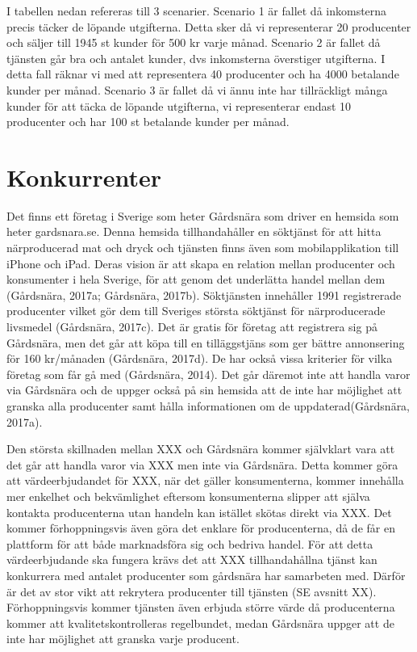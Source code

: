 \documentclass[10pt,a4paper,oneside]{article}
\begin{document}
I tabellen nedan refereras till 3 scenarier. Scenario 1 är fallet då inkomsterna precis täcker de löpande utgifterna. Detta sker då vi representerar 20 producenter och säljer till 1945 st kunder för 500 kr varje månad. Scenario 2 är fallet då tjänsten går bra och antalet kunder, dvs inkomsterna överstiger utgifterna. I detta fall räknar vi med att representera 40 producenter och ha 4000 betalande kunder per månad. Scenario 3 är fallet då vi ännu inte har tillräckligt många kunder för att täcka de löpande utgifterna, vi representerar endast 10 producenter och har 100 st betalande kunder per månad. 

\newpage

\section{Konkurrenter}
Det finns ett företag i Sverige som heter Gårdsnära som driver en hemsida som heter gardsnara.se. Denna hemsida tillhandahåller en söktjänst för att hitta närproducerad mat och dryck och tjänsten finns även som mobilapplikation till iPhone och iPad. Deras vision är att skapa en relation mellan producenter och konsumenter i hela Sverige, för att genom det underlätta handel mellan dem (Gårdsnära, 2017a; Gårdsnära, 2017b). Söktjänsten innehåller 1991 registrerade producenter vilket gör dem till Sveriges största söktjänst för närproducerade livsmedel (Gårdsnära, 2017c). Det är gratis för företag att registrera sig på Gårdsnära, men det går att köpa till en tilläggstjäns som ger bättre annonsering för 160 kr/månaden (Gårdsnära, 2017d). De har också vissa kriterier för vilka företag som får gå med (Gårdsnära, 2014). Det går däremot inte att handla varor via Gårdsnära och de uppger också på sin hemsida att de inte har möjlighet att granska alla producenter samt hålla informationen om de uppdaterad(Gårdsnära, 2017a).

Den största skillnaden mellan XXX och Gårdsnära kommer självklart vara att det går att handla varor via XXX men inte via Gårdsnära. Detta kommer göra att värdeerbjudandet för XXX, när det gäller konsumenterna, kommer innehålla mer enkelhet och bekvämlighet eftersom konsumenterna slipper att själva kontakta producenterna utan handeln kan istället skötas direkt via XXX. Det kommer förhoppningsvis även göra det enklare för producenterna, då de får en plattform för att både marknadsföra sig och bedriva handel. För att detta värdeerbjudande ska fungera krävs det att XXX tillhandahållna tjänst kan konkurrera med antalet producenter som gårdsnära har samarbeten med. Därför är det av stor vikt att rekrytera producenter till tjänsten (SE avsnitt XX). Förhoppningsvis kommer tjänsten även erbjuda större värde då producenterna kommer att kvalitetskontrolleras regelbundet, medan Gårdsnära uppger att de inte har möjlighet att granska varje producent.
\end{document}
